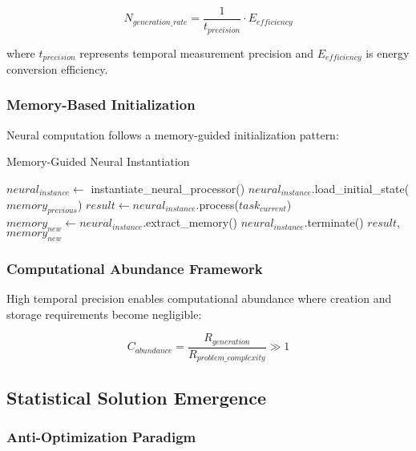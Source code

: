\documentclass[12pt,a4paper]{article}
\begin{document}
\begin{equation}
N_{generation\_rate} = \frac{1}{t_{precision}} \cdot E_{efficiency}
\end{equation}

where $t_{precision}$ represents temporal measurement precision and $E_{efficiency}$ is energy conversion efficiency.

\subsubsection{Memory-Based Initialization}

Neural computation follows a memory-guided initialization pattern:

\begin{algorithm}
\caption{Memory-Guided Neural Instantiation}
\begin{algorithmic}
    \State $neural_{instance} \leftarrow$ instantiate\_neural\_processor()
    \State $neural_{instance}$.load\_initial\_state($memory_{previous}$)
    \State $result \leftarrow neural_{instance}$.process($task_{current}$)
    \State $memory_{new} \leftarrow neural_{instance}$.extract\_memory()
    \State $neural_{instance}$.terminate()
    \State \Return $result$, $memory_{new}$
\EndProcedure
\end{algorithmic}
\end{algorithm}

\subsubsection{Computational Abundance Framework}

High temporal precision enables computational abundance where creation and storage requirements become negligible:

\begin{equation}
C_{abundance} = \frac{R_{generation}}{R_{problem\_complexity}} \gg 1
\end{equation}

\subsection{Statistical Solution Emergence}

\subsubsection{Anti-Optimization Paradigm}
\end{document}
